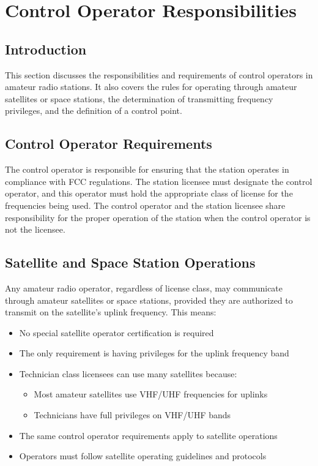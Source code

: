 \section{Control Operator Responsibilities}
\label{sec:control_operator}

\subsection*{Introduction}
This section discusses the responsibilities and requirements of control operators in amateur radio stations. It also covers the rules for operating through amateur satellites or space stations, the determination of transmitting frequency privileges, and the definition of a control point.

\subsection*{Control Operator Requirements}
The control operator is responsible for ensuring that the station operates in compliance with FCC regulations. The station licensee must designate the control operator, and this operator must hold the appropriate class of license for the frequencies being used. The control operator and the station licensee share responsibility for the proper operation of the station when the control operator is not the licensee.

\subsection*{Satellite and Space Station Operations}
Any amateur radio operator, regardless of license class, may communicate through amateur satellites or space stations, provided they are authorized to transmit on the satellite's uplink frequency. This means:

\begin{itemize}
    \item No special satellite operator certification is required
    \item The only requirement is having privileges for the uplink frequency band
    \item Technician class licensees can use many satellites because:
        \begin{itemize}
            \item Most amateur satellites use VHF/UHF frequencies for uplinks
            \item Technicians have full privileges on VHF/UHF bands
        \end{itemize}
    \item The same control operator requirements apply to satellite operations
    \item Operators must follow satellite operating guidelines and protocols
\end{itemize}

